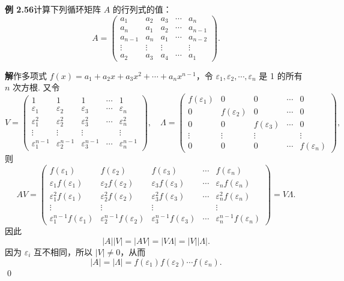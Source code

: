 \documentclass[UTF8,12pt,a4paper,fontset=fandol]{ctexart}
\begin{document}
\noindent\textbf{例 2.56}\quad 计算下列循环矩阵 $A$ 的行列式的值：
\[
A=
\left(
\begin{array}{ccccc}
a_1 & a_2 & a_3 & \cdots & a_n\\
a_n & a_1 & a_2 & \cdots & a_{n-1}\\
a_{n-1} & a_n & a_1 & \cdots & a_{n-2}\\
\vdots & \vdots & \vdots & & \vdots\\
a_2 & a_3 & a_4 & \cdots & a_1
\end{array}
\right).
\]

\noindent\textbf{解}\quad 作多项式 $f(x)=a_1+a_2x+a_3x^2+\cdots+a_nx^{n-1}$，令 $\varepsilon_1,\varepsilon_2,\cdots,\varepsilon_n$ 是 1 的所有 $n$ 次方根. 又令
\[
V=
\left(
\begin{array}{ccccc}
1 & 1 & 1 & \cdots & 1\\
\varepsilon_1 & \varepsilon_2 & \varepsilon_3 & \cdots & \varepsilon_n\\
\varepsilon_1^2 & \varepsilon_2^2 & \varepsilon_3^2 & \cdots & \varepsilon_n^2\\
\vdots & \vdots & \vdots & & \vdots\\
\varepsilon_1^{n-1} & \varepsilon_2^{n-1} & \varepsilon_3^{n-1} & \cdots & \varepsilon_n^{n-1}
\end{array}
\right),\quad
\Lambda=
\left(
\begin{array}{ccccc}
f(\varepsilon_1) & 0 & 0 & \cdots & 0\\
0 & f(\varepsilon_2) & 0 & \cdots & 0\\
0 & 0 & f(\varepsilon_3) & \cdots & 0\\
\vdots & \vdots & \vdots & & \vdots\\
0 & 0 & 0 & \cdots & f(\varepsilon_n)
\end{array}
\right),
\]
则
\[
AV=
\left(
\begin{array}{ccccc}
f(\varepsilon_1) & f(\varepsilon_2) & f(\varepsilon_3) & \cdots & f(\varepsilon_n)\\
\varepsilon_1f(\varepsilon_1) & \varepsilon_2f(\varepsilon_2) & \varepsilon_3f(\varepsilon_3) & \cdots & \varepsilon_nf(\varepsilon_n)\\
\varepsilon_1^2f(\varepsilon_1) & \varepsilon_2^2f(\varepsilon_2) & \varepsilon_3^2f(\varepsilon_3) & \cdots & \varepsilon_n^2f(\varepsilon_n)\\
\vdots & \vdots & \vdots & & \vdots\\
\varepsilon_1^{n-1}f(\varepsilon_1) & \varepsilon_2^{n-1}f(\varepsilon_2) & \varepsilon_3^{n-1}f(\varepsilon_3) & \cdots & \varepsilon_n^{n-1}f(\varepsilon_n)
\end{array}
\right)
=V\Lambda.
\]
因此
\[
|A||V|=|AV|=|V\Lambda|=|V||\Lambda|.
\]
因为 $\varepsilon_i$ 互不相同，所以 $|V|\ne0$，从而
\[
|A|=|\Lambda|=f(\varepsilon_1)f(\varepsilon_2)\cdots f(\varepsilon_n).
\]
\qed
\end{document}
